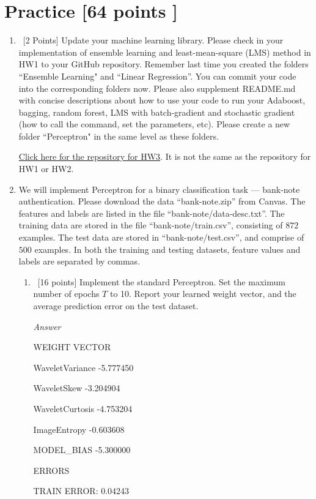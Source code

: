 \documentclass[12pt, fullpage,letterpaper]{article}
\begin{document}
\section{Practice [64 points ]}
\begin{enumerate}
	\item~[2 Points] Update your machine learning library. Please check in your implementation of ensemble learning and least-mean-square (LMS) method in HW1 to your GitHub repository. Remember last time you created the folders ``Ensemble Learning" and ``Linear Regression''. You can commit your code into the corresponding folders now. Please also supplement README.md with concise descriptions about how to use your code to run your Adaboost, bagging, random forest, LMS with batch-gradient and stochastic gradient (how to call the command, set the parameters, etc). Please create a new folder ``Perceptron" in the same level as these folders.
	
	\href{https://github.com/Paul-Wissler/cs-6350-hw3}{Click here for the repository for HW3}. It is not the same as the repository for HW1 or HW2.

\item We will implement  Perceptron for a binary classification task --- bank-note authentication. Please download the data ``bank-note.zip'' from Canvas. The features and labels are listed in the file ``bank-note/data-desc.txt''. The training data are stored in the file ``bank-note/train.csv'', consisting of $872$ examples. The test data are stored in ``bank-note/test.csv'', and comprise of $500$ examples. In both the training and testing datasets, feature values and labels are separated by commas. 
\begin{enumerate}
	\item~[16 points] Implement the standard Perceptron. Set the maximum number of epochs $T$ to 10. Report your learned weight vector, and the average prediction error on the test dataset. 
	
	\emph{Answer}
	
	WEIGHT VECTOR
	
	WaveletVariance   -5.777450
	
    WaveletSkew       -3.204904
    
    WaveletCurtosis   -4.753204
    
    ImageEntropy      -0.603608
    
    MODEL\_BIAS        -5.300000
    
    ERRORS
	
	TRAIN ERROR:  0.04243
	

\end{enumerate}
\end{enumerate}
\end{document}
